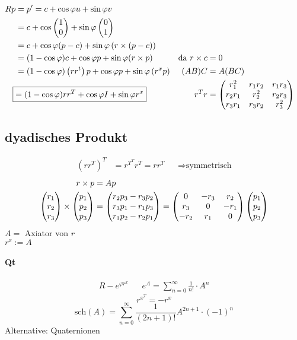 \begin{align*}
	Rp & = p' = c + \cos \varphi u + \sin \varphi v\\
	& = c + \cos \vektor{1\\0} + \sin \varphi \vektor{0\\1}\\
	& = c + \cos \varphi (p-c) + \sin \varphi \left( r \times (p-c) \right)\\
	& = (1 - \cos \varphi) c + \cos \varphi p + \sin \varphi (r\times p) & \text{da } r\times c & = 0\\
	& = (1 - \cos \varphi) \left( rr^t \right)p + \cos \varphi p + \sin \varphi \left( r^xp \right)&(AB)C &=A(BC)\\
	\Aboxed{&=(1-\cos\varphi) rr^T + \cos \varphi I + \sin\varphi r^x } & r^Tr & = \vektor{r_1^2&r_1r_2&r_1r_3\\r_2r_1&r_2^2&r_2r_3\\r_3r_1&r_3r_2&r_3^2}
\end{align*}
\subsection{dyadisches Produkt}
\begin{align*}
\left( rr^T \right)^T &= r^{T^T}r^T = rr^T&&\Rightarrow \text{symmetrisch}
\end{align*}
\begin{align*}
&&r\times p &=Ap&&\\
&&\begin{pmatrix}r_1\\r_2\\r_3\end{pmatrix} \times \begin{pmatrix}p_1\\p_2\\p_3\end{pmatrix} &= \begin{pmatrix}r_2p_3-r_3p_2\\r_3p_1-r_1p_3\\r_1p_2-r_2p_1\end{pmatrix} = \begin{pmatrix}0&-r_3&r_2\\r_3&0&-r_1\\-r_2&r_1&0\end{pmatrix}\begin{pmatrix}p_1\\p_2\\p_3\end{pmatrix}
\end{align*}
$A=$ Axiator von $r$\\
$r^x := A$
\paragraph{Qt}

\begin{align*}
	R-e^{\varphi r^x}&&e^A = \sum_{n=0}^{\infty} \frac{1}{n!}\cdot A^n 
	\end{align*}
\[ r^{x^T} = -r^x \]
\[ \text{sch}(A) = \sum_{n=0}^\infty \frac{1}{(2n+1)!}A^{2n+1}\cdot(-1)^n \]
Alternative: Quaternionen